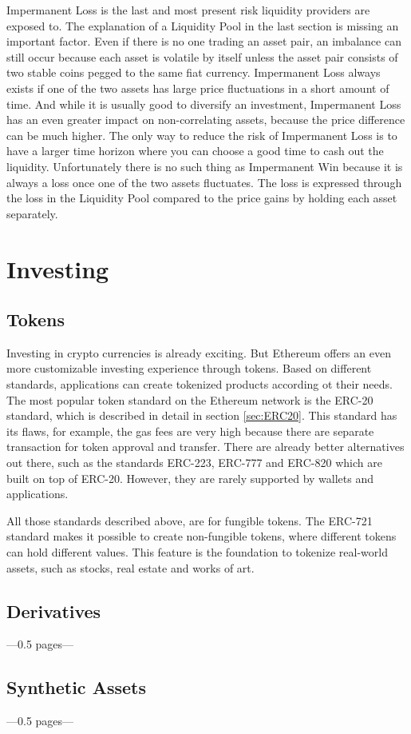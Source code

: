 Impermanent Loss is the last and most present risk liquidity providers are exposed to. The explanation of a Liquidity Pool in the last section is missing an important factor. Even if there is no one trading an asset pair, an imbalance can still occur because each asset is volatile by itself unless the asset pair consists of two stable coins pegged to the same fiat currency. Impermanent Loss always exists if one of the two assets has large price fluctuations in a short amount of time. And while it is usually good to diversify an investment, Impermanent Loss has an even greater impact on non-correlating assets, because the price difference can be much higher. The only way to reduce the risk of Impermanent Loss is to have a larger time horizon where you can choose a good time to cash out the liquidity. Unfortunately there is no such thing as Impermanent Win because it is always a loss once one of the two assets fluctuates. The loss is expressed through the loss in the Liquidity Pool compared to the price gains by holding each asset separately.

\section{Investing}
\subsection{Tokens}
Investing in crypto currencies is already exciting. But Ethereum offers an even more customizable investing experience through tokens. Based on different standards, applications can create tokenized products according ot their needs. The most popular token standard on the Ethereum network is the ERC-20 standard, which is described in detail in section \ref{sec:ERC20}. This standard has its flaws, for example, the gas fees are very high because there are separate transaction for token approval and transfer. There are already better alternatives out there, such as the standards ERC-223, ERC-777 and ERC-820 which are built on top of ERC-20. However, they are rarely supported by wallets and applications.

All those standards described above, are for fungible tokens. The ERC-721 standard makes it possible to create non-fungible tokens, where different tokens can hold different values. This feature is the foundation to tokenize real-world assets, such as stocks, real estate and works of art.

\subsection{Derivatives}
---0.5 pages---
\subsection{Synthetic Assets}
---0.5 pages---

